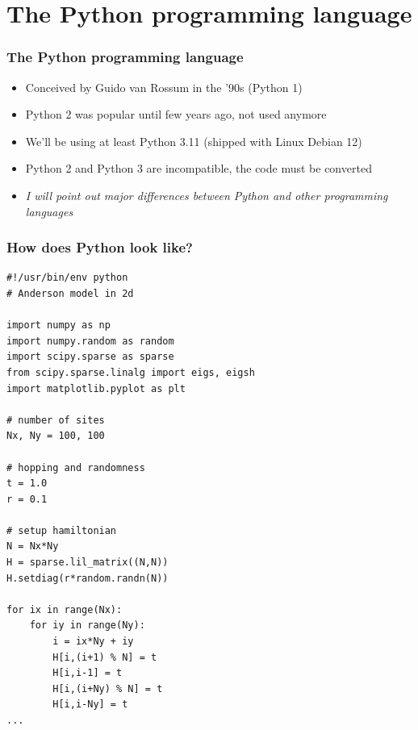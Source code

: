 \documentclass{beamer}
\begin{document}
\section{The Python programming language}
\begin{frame}[fragile]
  \frametitle{The Python programming language}
  \begin{itemize}
  \item Conceived by Guido van Rossum in the '90s (Python 1)
  \item Python 2 was popular until few years ago, not used anymore
  \item We'll be using at least Python 3.11 (shipped with Linux Debian 12)
  \item Python 2 and Python 3 are incompatible, the code must be converted
  \item \emph{I will point out major differences between Python and other programming languages}
  \end{itemize}
\end{frame}

\begin{frame}[fragile]
  \frametitle{How does Python look like?}
  \lstset{language=Python,basicstyle=\tiny\ttfamily,keywordstyle=\color{blue}, stringstyle=\color{green},numberstyle=\color{red}]}
  \begin{lstlisting}
#!/usr/bin/env python
# Anderson model in 2d

import numpy as np
import numpy.random as random
import scipy.sparse as sparse
from scipy.sparse.linalg import eigs, eigsh
import matplotlib.pyplot as plt

# number of sites
Nx, Ny = 100, 100

# hopping and randomness
t = 1.0
r = 0.1

# setup hamiltonian
N = Nx*Ny
H = sparse.lil_matrix((N,N))
H.setdiag(r*random.randn(N))

for ix in range(Nx):
    for iy in range(Ny):
        i = ix*Ny + iy
        H[i,(i+1) % N] = t
        H[i,i-1] = t
        H[i,(i+Ny) % N] = t
        H[i,i-Ny] = t
...
  \end{lstlisting}
\end{frame}
\end{document}
